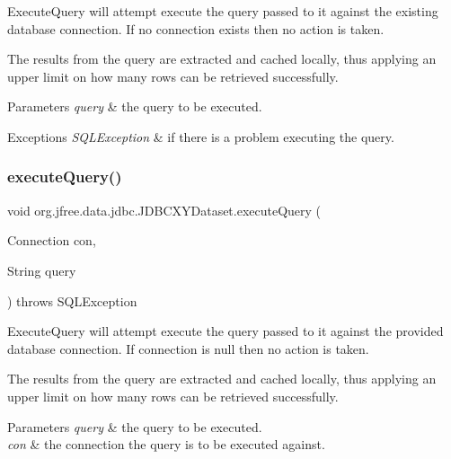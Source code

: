 Execute\+Query will attempt execute the query passed to it against the existing database connection. If no connection exists then no action is taken.

The results from the query are extracted and cached locally, thus applying an upper limit on how many rows can be retrieved successfully.


\begin{DoxyParams}{Parameters}
{\em query} & the query to be executed.\\
\hline
\end{DoxyParams}

\begin{DoxyExceptions}{Exceptions}
{\em S\+Q\+L\+Exception} & if there is a problem executing the query. \\
\hline
\end{DoxyExceptions}
\mbox{\label{classorg_1_1jfree_1_1data_1_1jdbc_1_1_j_d_b_c_x_y_dataset_a20e6b9e145babdee661ece7acd451ec1}} 
\subsubsection{\texorpdfstring{execute\+Query()}{executeQuery()}\hspace{0.1cm}{\footnotesize\ttfamily [2/2]}}
{\footnotesize\ttfamily void org.\+jfree.\+data.\+jdbc.\+J\+D\+B\+C\+X\+Y\+Dataset.\+execute\+Query (\begin{DoxyParamCaption}\item[{Connection}]{con,  }\item[{String}]{query }\end{DoxyParamCaption}) throws S\+Q\+L\+Exception}

Execute\+Query will attempt execute the query passed to it against the provided database connection. If connection is null then no action is taken.

The results from the query are extracted and cached locally, thus applying an upper limit on how many rows can be retrieved successfully.


\begin{DoxyParams}{Parameters}
{\em query} & the query to be executed. \\
\hline
{\em con} & the connection the query is to be executed against.\\
\hline
\end{DoxyParams}

